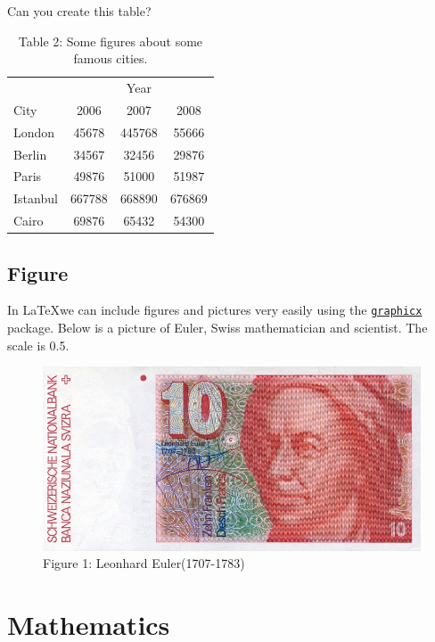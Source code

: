 \documentclass[a4paper, 11pt]{article}
\begin{document}
Can you create this table?
\begin{table}[h]
\centering  
\begin{tabular}{l|ccc}            
 & & Year &\\ 
\cline{2-4}
City & 2006 & 2007 & 2008\\
\hline
London & 45678 & 445768 & 55666\\
Berlin & 34567 & 32456 & 29876\\
Paris & 49876 & 51000 & 51987\\
Istanbul & 667788 & 668890 & 676869\\
Cairo & 69876 & 65432 & 54300\\
\hline
\end{tabular}
\caption{Table 2: Some figures about some famous cities.}
\end{table}





\subsection{Figure}                %
In \LaTeX we can include figures and pictures very easily using the \underline{\texttt{graphicx}} package. Below is a picture
of Euler, Swiss mathematician and scientist. The scale is 0.5.
\begin{figure}[h]     %
\centering
\includegraphics[scale=0.5]{Euler} %
\caption{Figure 1: Leonhard Euler(1707-1783)}
\end{figure}


\section{Mathematics}
\end{document}

